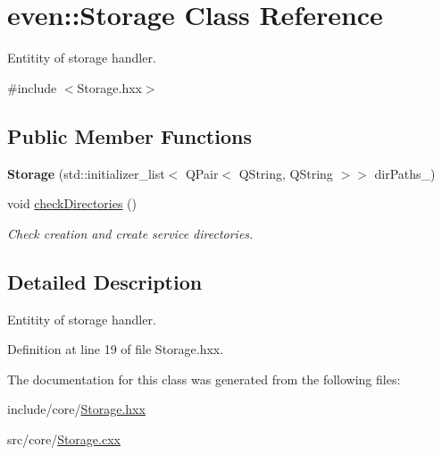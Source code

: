 \hypertarget{classeven_1_1_storage}{}\section{even\+:\+:Storage Class Reference}
\label{classeven_1_1_storage}


Entitity of storage handler.  




{\ttfamily \#include $<$Storage.\+hxx$>$}

\subsection*{Public Member Functions}
\begin{DoxyCompactItemize}
\item 
\mbox{\label{classeven_1_1_storage_a425a04e78aae4cf583cb2a9a2fd7e69a}} 
{\bfseries Storage} (std\+::initializer\+\_\+list$<$ Q\+Pair$<$ Q\+String, Q\+String $>$$>$ dir\+Paths\+\_\+)
\item 
\mbox{\label{classeven_1_1_storage_acc6cb157b29c4a778165ab3a9a9d287f}} 
void \mbox{\hyperlink{classeven_1_1_storage_acc6cb157b29c4a778165ab3a9a9d287f}{check\+Directories}} ()
\begin{DoxyCompactList}\small\item\em Check creation and create service directories. \end{DoxyCompactList}\end{DoxyCompactItemize}


\subsection{Detailed Description}
Entitity of storage handler. 

Definition at line 19 of file Storage.\+hxx.



The documentation for this class was generated from the following files\+:\begin{DoxyCompactItemize}
\item 
include/core/\mbox{\hyperlink{_storage_8hxx}{Storage.\+hxx}}\item 
src/core/\mbox{\hyperlink{_storage_8cxx}{Storage.\+cxx}}\end{DoxyCompactItemize}
